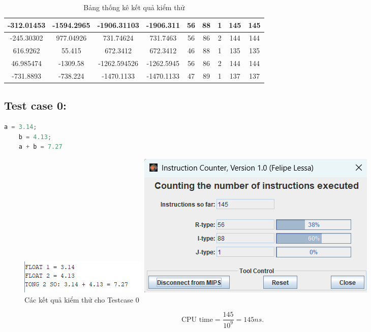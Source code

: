 {\begin{table}[H]
{\begin{tabular}{|c|c|c|c|c|c|c|c|c|}
\hline
 -312.01453&-1594.2965 &-1906.31103 &-1906.311 & 56 &88 & 1& 145& 145\\
\hline
-245.30302 &977.04926 &731.74624  & 731.7463&56 & 86&2 &144 & 144\\
\hline
 616.9262&55.415 &672.3412&672.3412 &46 &88 &1 &135 & 135\\
\hline
 46.985474& -1309.58& -1262.594526 &-1262.5945 &56 &86 &2 &144 &144 \\
\hline
 -731.8893&-738.224 &-1470.1133  & -1470.1133&47 &89 &1 &137 & 137\\
 \hline
\end{tabular}
}
\caption{Bảng thống kê kết quả kiểm thử }
\end{table}
}

\subsection{Test case 0:}
\begin{lstlisting}[language=Python]
    a = 3.14;
    b = 4.13;
    a + b = 7.27
\end{lstlisting}

\begin{figure}[!h]
    \centering
    \begin{minipage}[b]{0.48\textwidth}
        \centering
        \includegraphics[width=\textwidth]{image/TESTCASE/Testcase 0.png}
    \end{minipage}
    \hfill
    \begin{minipage}[b]{0.48\textwidth}
        \centering
        \includegraphics[width=\textwidth]{image/TESTCASE/Instruction Counter 0.png}
    \end{minipage}
    \vspace{0.5cm}
    \caption{Các kết quả kiểm thử cho Testcase 0}
\end{figure}
\[
\text{CPU time} = \frac{\text{145}}{10^9} = 145 ns.
\]

